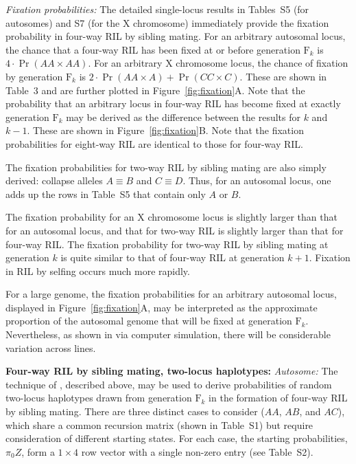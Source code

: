 \documentclass[12pt,letterpaper]{article}
\begin{document}
\emph{Fixation probabilities:} The detailed single-locus results in
Tables~S5 (for autosomes) and S7 (for the X chromosome) immediately
provide the fixation probability in four-way RIL by sibling mating.
For an arbitrary autosomal locus, the chance that a four-way RIL has
been fixed at or before generation $\text{F}_k$ is $4 \cdot
\Pr(AA \times AA)$. For an arbitrary X chromosome locus, the chance of
fixation by generation $\text{F}_k$ is $2 \cdot \Pr(AA \times A) +
\Pr(CC \times C)$.  These are shown in Table~3 and are further plotted
in Figure~\ref{fig:fixation}A.  Note that the
probability that an arbitrary locus in four-way RIL has become fixed
at exactly generation $\text{F}_k$ may be derived as the difference between the results
for $k$ and $k-1$.  These are shown in Figure~\ref{fig:fixation}B.
Note that the fixation probabilities for eight-way RIL are identical
to those for four-way RIL.

The fixation probabilities for two-way RIL by sibling mating are also
simply derived: collapse alleles $A \equiv B$ and $C \equiv
D$.  Thus, for an autosomal locus, one adds up the rows in Table~S5 
that contain only $A$ or $B$.

The fixation probability for an X chromosome locus is slightly larger
than that for an autosomal locus, and that for two-way RIL is slightly
larger than that for four-way RIL.  The fixation probability for
two-way RIL by sibling mating at generation $k$ is quite similar to that of 
four-way RIL at generation $k+1$.  Fixation in RIL by
selfing occurs much more rapidly.  

For a large genome, the fixation probabilities for an arbitrary
autosomal locus, displayed in Figure~\ref{fig:fixation}A, may be
interpreted as the approximate proportion of the autosomal genome that
will be fixed at generation $\text{F}_k$.  Nevertheless, as shown in
\citet{Broman2005} via computer simulation, there will be considerable
variation across lines.



\textbf{Four-way RIL by sibling mating, two-locus haplotypes:}
\emph{Autosome:} The technique of \citet{Kimura1963}, described above,
may be used to derive probabilities of random two-locus haplotypes
drawn from generation $\text{F}_k$ in the formation of four-way RIL by
sibling mating.  There are three distinct cases to consider ($AA$,
$AB$, and $AC$), which share a common recursion matrix (shown in
Table~S1) but require consideration of different starting states.  For
each case, the starting probabilities, $\pi_0 Z$, form a $1 \times 4$
row vector with a single non-zero entry (see Table~S2).
\end{document}
